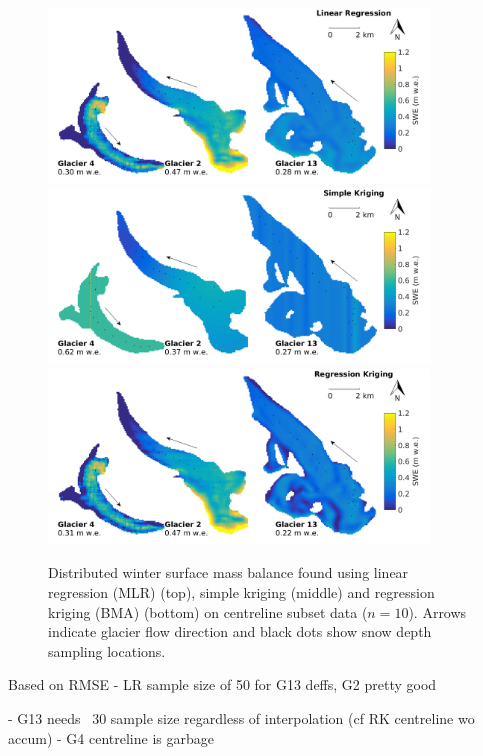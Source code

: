 \documentclass[12pt]{article}
\newcommand{\topomap}{Arrows indicate glacier flow direction and black dots show snow depth sampling locations. }
\begin{document}
\pagebreak
\begin{figure}[H]
	\centering
	\includegraphics[width =0.9\textwidth]{MapSubset_LRcentreline_n10S4.png}\\
	\includegraphics[width =0.9\textwidth]{MapSubset_SKcentreline_n10S4.png}\\
	\includegraphics[width =0.9\textwidth]{MapSubset_RKcentreline_n10S4.png}\\
	\caption{Distributed winter surface mass balance found using  linear regression (MLR) (top), simple kriging (middle) and regression kriging (BMA) (bottom) on centreline subset data ($n=10$).  \topomap}
	\label{fig:MapSubset_centreline_n10S4}
\end{figure}


Based on RMSE
- LR sample size of 50 for G13 deffs, G2 pretty good

- G13 needs ~30 sample size regardless of interpolation (cf RK centreline wo accum)
- G4 centreline is garbage 
\end{document}
